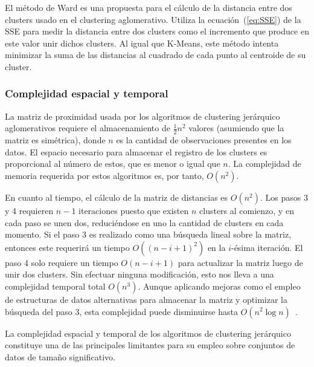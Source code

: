 El método de Ward es una propuesta para el cálculo de la distancia entre dos clusters usado en el clustering aglomerativo.
Utiliza la ecuación~(\ref{eq:SSE}) de la SSE para medir la distancia entre dos clusters como el incremento que produce en este valor unir dichos clusters.
Al igual que K-Means, este método intenta minimizar la suma de las distancias al cuadrado de cada punto al centroide de su cluster.

\subsubsection{Complejidad espacial y temporal}

La matriz de proximidad usada por los algoritmos de clustering jerárquico aglomerativos requiere el almacenamiento de $\frac{1}{2}n^2$ valores (asumiendo que la matriz es simétrica), donde $n$ es la cantidad de observaciones presentes en los datos.
El espacio necesario para almacenar el registro de los clusters es proporcional al número de estos, que es menor o igual que $n$.
La complejidad de memoria requerida por estos algoritmos es, por tanto, $O(n^2)$.

En cuanto al tiempo, el cálculo de la matriz de distancias es $O(n^2)$.
Los pasos 3 y 4 requieren $n-1$ iteraciones puesto que existen $n$ clusters al comienzo, y en cada paso se unen dos, reduciéndose en uno la cantidad de clusters en cada momento.
Si el paso 3 es realizado como una búsqueda lineal sobre la matriz, entonces este requerirá un tiempo $O((n-i+1)^2)$ en la $i$-ésima iteración.
El paso 4 solo requiere un tiempo $O(n-i+1)$ para actualizar la matriz luego de unir dos clusters.
Sin efectuar ninguna modificación, esto nos lleva a una complejidad temporal total $O(n^3)$.
Aunque aplicando mejoras como el empleo de estructuras de datos alternativas para almacenar la matriz y optimizar la búsqueda del paso 3, esta complejidad puede disminuirse hasta $O(n^2\log{n})$~\cite{Tan05}.

La complejidad espacial y temporal de los algoritmos de clustering jerárquico constituye una de las principales limitantes para su empleo sobre conjuntos de datos de tamaño significativo.
